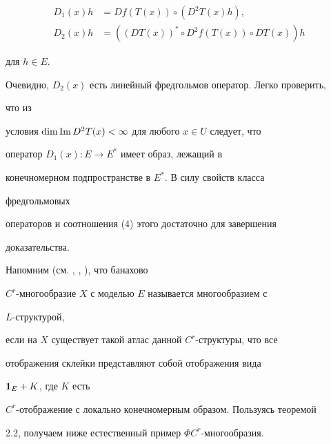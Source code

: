 \begin{pf}
\begin{align*}
D_1(x)h&=Df(T(x))\circ(D^2T(x)h),\\


D_2(x)h&=((DT(x))^*\circ D^2f(T(x))\circ DT(x))h


\end{align*}


для $h\in E$.





Очевидно, $D_2(x)$ есть линейный фредгольмов оператор. Легко проверить,


что из


условия $\dim\operatorname{Im} D^2T(x)<\infty$ для любого $x\in U$ следует, что


оператор $D_1(x):E\to E^*$ имеет образ, лежащий в


конечномерном подпространстве в $E^*$. В силу свойств класса


фредгольмовых


операторов и соотношения (4) этого достаточно для завершения


доказательства.


\end{pf}





Напомним (см. \cite{16}, \cite{17}, \cite{9}), что банахово


$C^r$-многообразие $X$ с моделью $E$ называется многообразием с


$L$-структурой,


если на $X$ существует такой атлас данной $C^r$-структуры, что все


отображения склейки представляют собой отображения вида


$\bold 1_E+K$, где $K$ есть


$C^r$-отображение с локально конечномерным образом. Пользуясь теоремой


2.2, получаем ниже естественный пример $\Phi C^r$-многообразия.





